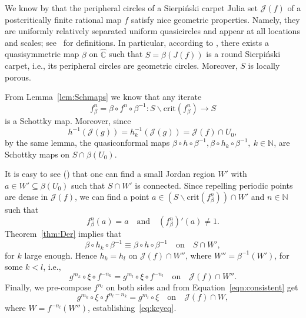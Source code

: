 \documentclass[12pt]{amsart}
\makeatletter
\newtheorem*{pf}{Proof}
\newcommand{\C}{\mathbb{C}}
\newcommand{\N}{\mathbb{N}}
\newcommand{\hC}{\widehat{\C}}
\newcommand{\sub}{\subseteq }
\newcommand{\J}{\mathcal{J}}
\newcommand{\co}{\colon}
\renewenvironment{pf}[1][\proofname]{%
  \par
  \pushQED{\qed}%
  \normalfont\topsep6\p@ \@plus6\p@ \trivlist
  \item[\hskip\labelsep\itshape
        \bfseries #1\@addpunct{:}]%
  \ignorespaces
}{%
  \popQED\endtrivlist
}
\makeatother
\begin{document}
\begin{pf}
We know by \cite[Theorem 1.10]{BLM} that the peripheral circles of a Sierpi\'nski carpet Julia set $\J(f)$ of a postcritically finite rational map $f$ satisfy nice geometric properties. Namely, they are uniformly relatively separated uniform quasicircles and appear at all locations and scales; see~\cite{BLM} for definitions. In particular, 
according to \cite[Corollary 1.2]{Bo}, there exists a quasisymmetric map $\beta$ on $\hC$ such that 
$S=\beta(J(f))$ is a round Sierpi\'nski carpet, i.e., its peripheral circles are geometric circles. Moreover, $S$ is locally porous.
%


From Lemma~\ref{lem:Schmaps} we know that any iterate 
$$f_\beta^n=\beta\circ f^n\circ \beta^{-1}\co S\backslash \mathrm{crit}(f_\beta^n)\to S$$ is a 
Schottky map.  
Moreover, since $$h^{-1}(\J(g))=h_k^{-1}(\J(g))=\J(f)\cap U_0,$$
by the same lemma, the quasiconformal maps 
$\beta\circ h\circ \beta^{-1}, \beta\circ h_k\circ \beta^{-1},\ k\in\N$, 
are Schottky maps on $S\cap \beta(U_0)$. 


It is easy to see (\cite[Lemma~2.1]{Me3}) that one can find a small Jordan region $W'$ with $a\in W'\sub \beta(U_0)$
such that $S\cap W'$ is connected. 
Since repelling periodic points are dense in $\J(f)$, we can find 
a point $a\in \left(S\backslash \mathrm{crit}(f_\beta^n)\right)\cap W'$ and $n\in\N$  such that 
$$f_\beta^n(a)=a \quad \mathrm{and}\quad (f_\beta^n)'(a)\neq 1.$$
Theorem~\ref{thm:Der} implies that 
$$\beta\circ h_k\circ \beta^{-1}\equiv \beta\circ h\circ \beta^{-1}\quad  \mathrm{on}\quad S\cap W', $$
 for $k$ large enough. Hence
$h_k=h_l$ on $\J(f)\cap W''$, where $W''=\beta^{-1}(W')$, for some $k<l$, i.e., 
$$g^{m_k}\circ \xi\circ f^{-n_k}=g^{m_l}\circ \xi\circ f^{-n_l}\quad  \mathrm{on}\quad \J(f)\cap W''.$$ 
Finally, we pre-compose $f^{n_l}$ on both sides and from Equation~\eqref{eqn:consistent} get 
$$g^{m_k}\circ \xi\circ f^{n_l-n_k}=g^{m_l}\circ \xi \quad  \mathrm{on}\quad \J(f)\cap W,$$ where $W=f^{-n_l}(W'')$, establishing~\eqref{eq:keyeq}.
\end{pf}
\end{document}
